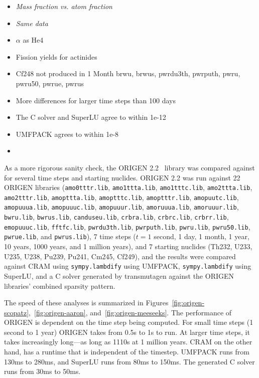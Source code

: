 \begin{itemize}
\item \it{Mass fraction vs. atom fraction}
\item {\it Same data}
\item $\alpha$ as He4
\item Fission yields for actinides
\item Cf248 not produced in 1 Month brwu, brwus, pwrdu3th, pwrputh, pwru,
  pwru50, pwrue, pwrus
\item More differences for larger time steps than 100 days
\item The C solver and SuperLU agree to within 1e-12
\item UMFPACK agrees to within 1e-8
\item {}
\end{itemize}

As a more rigorous sanity check, the ORIGEN 2.2~\cite{ationneeded} library was
compared against for several time steps and starting nuclides. ORIGEN 2.2 was
run against 22 ORIGEN libraries (\texttt{amo0tttr.\allowbreak{}lib},
\texttt{amo1ttta.\allowbreak{}lib}, \texttt{amo1tttc.\allowbreak{}lib},
\texttt{amo2ttta.\allowbreak{}lib}, \texttt{amo2tttr.\allowbreak{}lib},
\texttt{amopttta.\allowbreak{}lib}, \texttt{amoptttc.\allowbreak{}lib},
\texttt{amoptttr.\allowbreak{}lib}, \texttt{amopuutc.\allowbreak{}lib},
\texttt{amopuuua.\allowbreak{}lib}, \texttt{amopuuuc.\allowbreak{}lib},
\texttt{amopuuur.\allowbreak{}lib}, \texttt{amoruuua.\allowbreak{}lib},
\texttt{amoruuur.\allowbreak{}lib}, \texttt{bwru.\allowbreak{}lib},
\texttt{bwrus.\allowbreak{}lib}, \texttt{canduseu.\allowbreak{}lib},
\texttt{crbra.\allowbreak{}lib}, \texttt{crbrc.\allowbreak{}lib},
\texttt{crbrr.\allowbreak{}lib}, \texttt{emopuuuc.\allowbreak{}lib},
\texttt{fftfc.\allowbreak{}lib}, \texttt{pwrdu3th.\allowbreak{}lib},
\texttt{pwrputh.\allowbreak{}lib}, \texttt{pwru.\allowbreak{}lib},
\texttt{pwru50.\allowbreak{}lib}, \texttt{pwrue.\allowbreak{}lib}, and
\texttt{pwrus.\allowbreak{}lib}), 7 time steps ($t= 1$ second, 1 day, 1 month,
1 year, 10 years, 1000 years, and 1 million years), and 7 starting nuclides
(Th232, U233, U235, U238, Pu239, Pu241, Cm245, Cf249), and the results were
compared against CRAM using \texttt{sympy.\allowbreak{}lambdify} using
UMFPACK, \texttt{sympy.\allowbreak{}lambdify} using SuperLU, and a C solver
generated by transmutagen against the ORIGEN libraries' combined sparsity
pattern.

 The speed of these analyses is summarized in
Figures~\ref{fig:origen-scopatz},~\ref{fig:origen-aaron},
and~\ref{fig:origen-meeseeks}. The performance of ORIGEN is dependent on the
time step being computed. For small time steps (1 second to 1 year) ORIGEN
takes from 0.5\;s to 1\;s to run. At larger time steps, it takes increasingly
long---as long as 1110\;s at 1 million years. CRAM on the other hand, has a
runtime that is independent of the timestep. UMFPACK runs from 130\;ms to
280\;ms, and SuperLU runs from 80\;ms to 150\;ms. The generated C solver runs
from 30\;ms to 50\;ms. 

